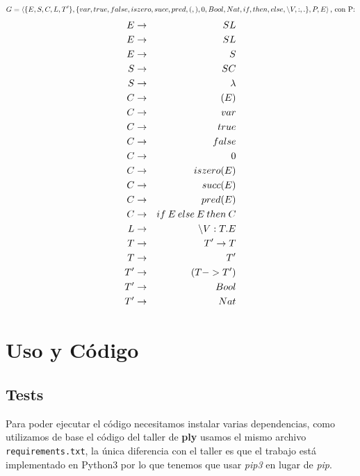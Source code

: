 \documentclass[spanish, a4paper]{article}
\begin{document}
$$G = \left<  \{E,S, C, L, T'\}, \{var, true, false, iszero, succ, pred, (, ), 0, Bool, Nat, if, then, else,  \textnormal{\textbackslash} V, :, . \}, P, E  \right> \textnormal{, con P:} $$
\begin{eqnarray}
 E  & \rightarrow  & S L \nonumber \\
  E  & \rightarrow & S L \nonumber \\
  E  & \rightarrow & S  \nonumber \\
  S  & \rightarrow & S C \nonumber \\
  S  & \rightarrow & \lambda  \nonumber\\
  C  &\rightarrow & (E)  \nonumber\\
  C &  \rightarrow & var  \nonumber\\
  C & \rightarrow & true  \nonumber\\
  C & \rightarrow & false  \nonumber\\
  C & \rightarrow & 0 \nonumber \\
  C & \rightarrow & iszero(E)  \nonumber\\
  C & \rightarrow & succ(E)  \nonumber\\
  C & \rightarrow & pred(E)  \nonumber\\
  C & \rightarrow & if \: E \: else \: E \: then \: C  \nonumber\\
  L & \rightarrow &  \textnormal{\textbackslash} V : T . E  \nonumber\\
  T & \rightarrow & T'  \rightarrow T  \nonumber\\
  T & \rightarrow & T'  \nonumber\\
  T' & \rightarrow & (T -> T')  \nonumber\\
  T' & \rightarrow & Bool  \nonumber\\
  T' &\rightarrow & Nat  \nonumber\\
\end{eqnarray}

\newpage
\section{Uso y Código}
\subsection{Tests}
Para poder ejecutar el código necesitamos instalar varias dependencias, como utilizamos de base el código del taller de \textbf{ply} usamos el mismo archivo \verb|requirements.txt|, la única diferencia con el taller es que el trabajo está implementado en Python3 por lo que tenemos que usar \textit{pip3} en lugar de \textit{pip}.
\end{document}
